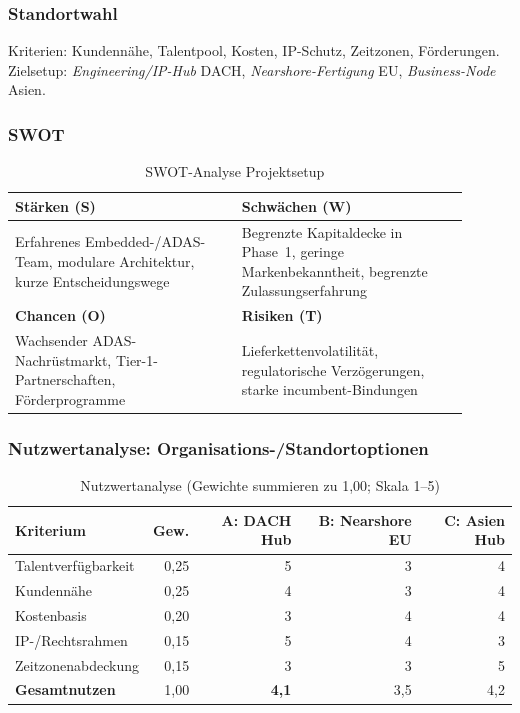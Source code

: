 \documentclass[
%
ngerman %
%
numeric %
]{wbh-assignment}
\begin{document}
\subsubsection{Standortwahl}
Kriterien: Kundennähe, Talentpool, Kosten, IP-Schutz, Zeitzonen, Förderungen. Zielsetup: \emph{Engineering/IP-Hub} DACH, \emph{Nearshore-Fertigung} EU, \emph{Business-Node} Asien.

\subsubsection{SWOT}
\begin{table}[htb!]
\centering
\caption{SWOT-Analyse Projektsetup}
\begin{tabular}{p{0.45\linewidth} p{0.45\linewidth}}
\textbf{Stärken (S)} & \textbf{Schwächen (W)} \\
\hline
Erfahrenes Embedded-/ADAS-Team, modulare Architektur, kurze Entscheidungswege &
Begrenzte Kapitaldecke in Phase~1, geringe Markenbekanntheit, begrenzte Zulassungserfahrung \\
\textbf{Chancen (O)} & \textbf{Risiken (T)} \\
\hline
Wachsender ADAS-Nachrüstmarkt, Tier-1-Partnerschaften, Förderprogramme &
Lieferkettenvolatilität, regulatorische Verzögerungen, starke incumbent-Bindungen \\
\end{tabular}
\end{table}

\subsubsection{Nutzwertanalyse: Organisations-/Standortoptionen}
\begin{table}[htb!]
\centering
\caption{Nutzwertanalyse (Gewichte summieren zu 1{,}00; Skala 1–5)}
\begin{tabular}{l r r r r}
\textbf{Kriterium} & \textbf{Gew.} & \textbf{A: DACH Hub} & \textbf{B: Nearshore EU} & \textbf{C: Asien Hub} \\
\hline
Talentverfügbarkeit & 0{,}25 & 5 & 3 & 4 \\
Kundennähe & 0{,}25 & 4 & 3 & 4 \\
Kostenbasis & 0{,}20 & 3 & 4 & 4 \\
IP-/Rechtsrahmen & 0{,}15 & 5 & 4 & 3 \\
Zeitzonenabdeckung & 0{,}15 & 3 & 3 & 5 \\
\hline
\textbf{Gesamtnutzen} & 1{,}00 & \textbf{4{,}1} & 3{,}5 & 4{,}2 \\
\end{tabular}
\end{table}
\end{document}
